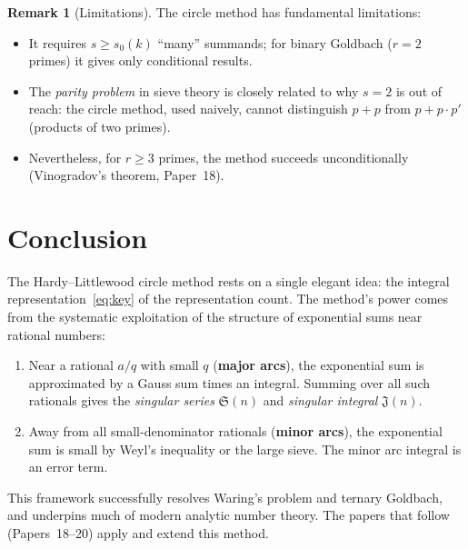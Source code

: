 \documentclass[12pt,a4paper]{amsart}
\theoremstyle{definition}
\newtheorem{remark}[theorem]{Remark}
\begin{document}
\begin{remark}[Limitations]
  The circle method has fundamental limitations:
  \begin{itemize}
    \item It requires $s \geq s_0(k)$ ``many'' summands; for binary Goldbach
      ($r = 2$ primes) it gives only conditional results.
    \item The \emph{parity problem} in sieve theory is closely related to why
      $s = 2$ is out of reach: the circle method, used naively, cannot
      distinguish $p + p$ from $p + p \cdot p'$ (products of two primes).
    \item Nevertheless, for $r \geq 3$ primes, the method succeeds
      unconditionally (Vinogradov's theorem, Paper~18).
  \end{itemize}
\end{remark}

\section{Conclusion}

The Hardy--Littlewood circle method rests on a single elegant idea: the
integral representation~\eqref{eq:key} of the representation count.
The method's power comes from the systematic exploitation of the
structure of exponential sums near rational numbers:
\begin{enumerate}
  \item Near a rational $a/q$ with small $q$ (\textbf{major arcs}),
    the exponential sum is approximated by a Gauss sum times an integral.
    Summing over all such rationals gives the \emph{singular series}
    $\mathfrak{S}(n)$ and \emph{singular integral} $\mathfrak{J}(n)$.
  \item Away from all small-denominator rationals (\textbf{minor arcs}),
    the exponential sum is small by Weyl's inequality or the large sieve.
    The minor arc integral is an error term.
\end{enumerate}

This framework successfully resolves Waring's problem and ternary Goldbach,
and underpins much of modern analytic number theory.  The papers that follow
(Papers~18--20) apply and extend this method.
\end{document}
